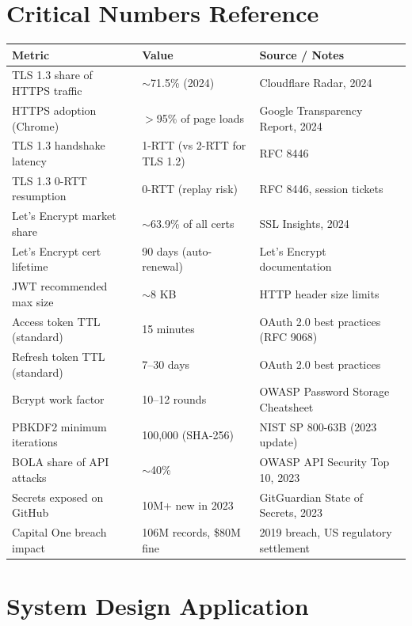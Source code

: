 \documentclass[11pt,a4paper]{article}
\begin{document}
\section{Critical Numbers Reference}

\begin{center}
\renewcommand{\arraystretch}{1.5}
\begin{tabular}{p{5cm} p{4.5cm} p{4cm}}
\toprule
\textbf{Metric} & \textbf{Value} & \textbf{Source / Notes} \\
\midrule
TLS 1.3 share of HTTPS traffic & $\sim$71.5\% (2024) & Cloudflare Radar, 2024 \\
HTTPS adoption (Chrome) & $>$95\% of page loads & Google Transparency Report, 2024 \\
TLS 1.3 handshake latency & 1-RTT (vs 2-RTT for TLS 1.2) & RFC 8446 \\
TLS 1.3 0-RTT resumption & 0-RTT (replay risk) & RFC 8446, session tickets \\
Let's Encrypt market share & $\sim$63.9\% of all certs & SSL Insights, 2024 \\
Let's Encrypt cert lifetime & 90 days (auto-renewal) & Let's Encrypt documentation \\
JWT recommended max size & $\sim$8 KB & HTTP header size limits \\
Access token TTL (standard) & 15 minutes & OAuth 2.0 best practices (RFC 9068) \\
Refresh token TTL (standard) & 7--30 days & OAuth 2.0 best practices \\
Bcrypt work factor & 10--12 rounds & OWASP Password Storage Cheatsheet \\
PBKDF2 minimum iterations & 100,000 (SHA-256) & NIST SP 800-63B (2023 update) \\
BOLA share of API attacks & $\sim$40\% & OWASP API Security Top 10, 2023 \\
Secrets exposed on GitHub & 10M+ new in 2023 & GitGuardian State of Secrets, 2023 \\
Capital One breach impact & 106M records, \$80M fine & 2019 breach, US regulatory settlement \\
\bottomrule
\end{tabular}
\end{center}

\section{System Design Application}
\end{document}
